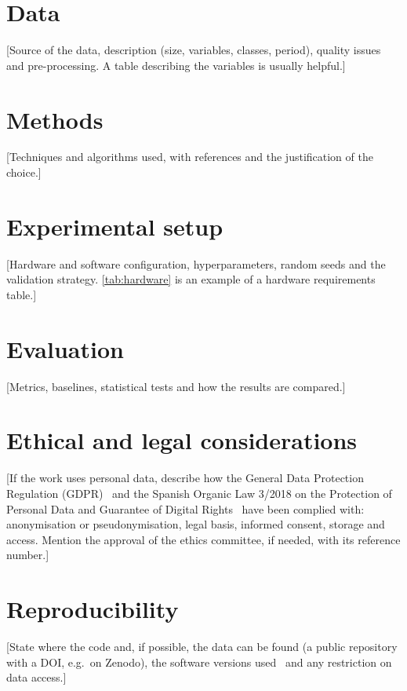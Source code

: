 \section{Data}\label{sec:data}

[Source of the data, description (size, variables, classes, period), quality issues and
pre-processing. A table describing the variables is usually helpful.]

\section{Methods}\label{sec:methods}

[Techniques and algorithms used, with references and the justification of the choice.]

\section{Experimental setup}\label{sec:setup}

[Hardware and software configuration, hyperparameters, random seeds and the
validation strategy. \autoref{tab:hardware} is an example of a hardware requirements table.]



\section{Evaluation}\label{sec:evaluation}

[Metrics, baselines, statistical tests and how the results are compared.]

\section{Ethical and legal considerations}\label{sec:ethics}

[If the work uses personal data, describe how the General Data Protection Regulation (GDPR)~\cite{gdpr2016} and the
Spanish Organic Law 3/2018 on the Protection of Personal Data and Guarantee of Digital
Rights~\cite{lopdgdd2018} have been complied with: anonymisation or pseudonymisation,
legal basis, informed consent, storage and access. Mention the approval of the ethics
committee, if needed, with its reference number.]

\section{Reproducibility}\label{sec:reproducibility}

[State where the code and, if possible, the data can be found (a public repository with a
DOI, e.g.\ on Zenodo), the software versions used~\cite{pedregosa2011scikit} and any
restriction on data access.]

